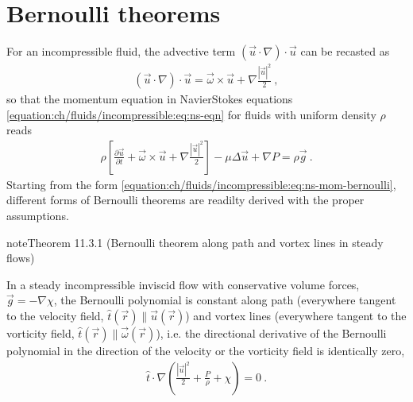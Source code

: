 \documentclass[letterpaper,10pt,english]{jupyterBook}
\begin{document}
\section{Bernoulli theorems}
\label{\detokenize{ch/fluids/incompressible:bernoulli-theorems}}\label{\detokenize{ch/fluids/incompressible:id1}}
\sphinxAtStartPar
For an incompressible fluid, the advective term \((\vec{u} \cdot \nabla) \cdot \vec{u}\) can be recasted as
\begin{equation*}
\begin{split}(\vec{u} \cdot \nabla) \cdot \vec{u} = \vec{\omega} \times \vec{u} + \nabla \frac{|\vec{u}|^2}{2} \ ,\end{split}
\end{equation*}
\sphinxAtStartPar
so that the momentum equation in Navier\sphinxhyphen{}Stokes equations \eqref{equation:ch/fluids/incompressible:eq:ns-eqn} for fluids with uniform density \(\rho\) reads
\begin{equation}\label{equation:ch/fluids/incompressible:eq:ns-mom-bernoulli}
\begin{split} \rho \left[ \frac{\partial \vec{u}}{\partial t} + \vec{\omega} \times \vec{u} + \nabla \frac{|\vec{u}|^2}{2} \right] - \mu \Delta \vec{u} + \nabla P = \rho \vec{g} \ .\end{split}
\end{equation}
\sphinxAtStartPar
Starting from the form \eqref{equation:ch/fluids/incompressible:eq:ns-mom-bernoulli}, different forms of Bernoulli theorems are readilty derived with the proper assumptions.
\label{ch/fluids/incompressible:theorem-0}
\begin{sphinxadmonition}{note}{Theorem 11.3.1 (Bernoulli theorem along path and vortex lines in steady flows)}



\sphinxAtStartPar
In a steady incompressible inviscid flow with conservative volume forces, \(\vec{g} = - \nabla \chi\), the Bernoulli polynomial is constant along path (everywhere tangent to the velocity field, \(\hat{t}(\vec{r}) \parallel \vec{u}(\vec{r})\)) and vortex lines (everywhere tangent to the vorticity field, \(\hat{t}(\vec{r}) \parallel \vec{\omega}(\vec{r})\)), i.e. the directional derivative of the Bernoulli polynomial in the direction of the velocity or the vorticity field is identically zero,
\begin{equation*}
\begin{split}\hat{t} \cdot \nabla \left( \frac{|\vec{u}|^2}{2} + \frac{P}{\rho} + \chi \right) = 0 \ .\end{split}
\end{equation*}\end{sphinxadmonition}
\end{document}
